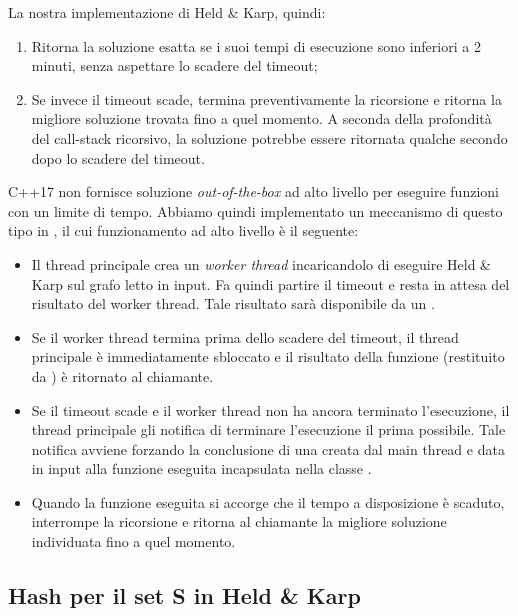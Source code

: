\noindent La nostra implementazione di Held \& Karp, quindi:

\begin{enumerate}
    \item Ritorna la soluzione esatta se i suoi tempi di esecuzione sono inferiori a 2 minuti, senza aspettare lo scadere del timeout;
    \item Se invece il timeout scade, termina preventivamente la ricorsione e ritorna la migliore soluzione trovata fino a quel momento. A seconda della profondità del call-stack ricorsivo, la soluzione potrebbe essere ritornata qualche secondo dopo lo scadere del timeout.
\end{enumerate}

\noindent C++17 non fornisce soluzione \textit{out-of-the-box} ad alto livello per eseguire funzioni con un limite di tempo. Abbiamo quindi implementato un meccanismo di questo tipo in , il cui funzionamento ad alto livello è il seguente:

\begin{itemize}
    \item Il thread principale crea un \textit{worker thread} incaricandolo di eseguire Held \& Karp sul grafo letto in input. Fa quindi partire il timeout e resta in attesa del risultato del worker thread. Tale risultato sarà disponibile da un .
    \item Se il worker thread termina prima dello scadere del timeout, il thread principale è immediatamente sbloccato e il risultato della funzione (restituito da ) è ritornato al chiamante.
    \item Se il timeout scade e il worker thread non ha ancora terminato l'esecuzione, il thread principale gli notifica di terminare l'esecuzione il prima possibile. Tale notifica avviene forzando la conclusione di una  creata dal main thread e data in input alla funzione eseguita incapsulata nella classe .
    \item Quando la funzione eseguita si accorge che il tempo a disposizione è scaduto, interrompe la ricorsione e ritorna al chiamante la migliore soluzione individuata fino a quel momento.
\end{itemize}

\subsection{Hash per il set S in Held \& Karp}
\label{hashing}


